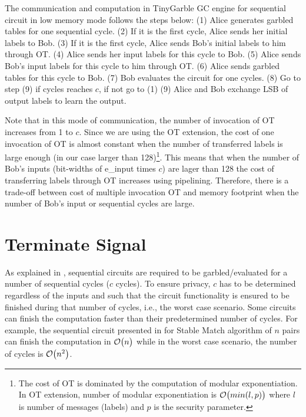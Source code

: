 The communication and computation in TinyGarble GC engine for sequential circuit in low memory mode follows the steps below:
(1) Alice generates garbled tables for one sequential cycle.
(2) If it is the first cycle, Alice sends her initial labels to Bob.
(3) If it is the first cycle, Alice sends Bob's initial labels to him through OT.
(4) Alice sends her input labels for this cycle to Bob.
(5) Alice sends Bob's input labels for this cycle to him through OT.
(6) Alice sends garbled tables for this cycle to Bob.
(7) Bob evaluates the circuit for one cycles.
(8) Go to step (9) if cycles reaches $c$, if not go to (1) 
(9) Alice and Bob exchange LSB of output labels to learn the output.

Note that in this mode of communication, the number of invocation of OT increases from 1 to $c$.
Since we are using the OT extension, the cost of one invocation of OT is almost constant when the number of transferred labels is large enough (in our case larger than 128)\footnote{The cost of OT is dominated by the computation of modular exponentiation. In OT extension, number of modular exponentiation is $\mathcal{O}\bigl(min(l, p)\bigr)$ where $l$ is number of messages (labels) and $p$ is the security parameter.}.
This means that when the number of Bob's inputs (bit-widths of e\_input times $c$) are lager than 128 the cost of transferring labels through OT increases using pipelining.
Therefore, there is a trade-off between cost of multiple invocation OT and memory footprint when the number of Bob's input or sequential cycles are large.

\section{Terminate Signal}\label{ssec:engine-term}
As explained in , sequential circuits are required to be garbled/evaluated for a number of sequential cycles ($c$ cycles).
To ensure privacy, $c$ has to be determined regardless of the inputs and such that the circuit functionality is ensured to be finished during that number of cycles, i.e., the worst case scenario.
Some circuits can finish the computation faster than their predetermined number of cycles.
For example, the sequential circuit presented in \cite{riazi2017toward} for Stable Match algorithm of $n$ pairs can finish the computation in $\mathcal{O}\bigl(n\bigr)$ while in the worst case scenario, the number of cycles is $\mathcal{O}\bigl(n^2\bigr)$.

